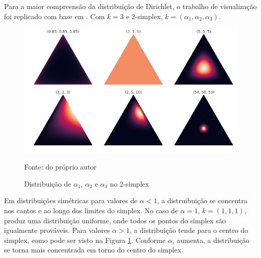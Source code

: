 Para a maior compreensão da distribuição de Dirichlet, o trabalho de visualização foi replicado com base em \cite{liu2019}. Com $k=3$ e $2$-simplex, $k=(\alpha_1, \alpha_2, \alpha_3)$. 


\begin{figure}[!h]
	\centering
	\includegraphics[keepaspectratio=true,scale=0.35]{figuras/dist-diri-simplex.png}
	\caption{Distribuição de $\alpha_1$, $\alpha_2$ e $\alpha_3$ no 2-simplex}
	Fonte: do próprio autor
	\label{fig08}
\end{figure}


Em distribuições simétricas para valores de $\alpha<1$, a distruibuição se concentra nos cantos e ao longo dos limites do simplex. No caso de $\alpha=1$, $k=(1,1,1)$, produz uma distribuição uniforme, onde todos os pontos do simplex são igualmente prováveis. Para valores $\alpha>1$, a distribuição tende para o centro do simplex, como pode ser visto na Figura \ref{fig08}. Conforme $\alpha_i$ aumenta, a distribuição se torna mais concentrada em torno do centro do simplex. 


